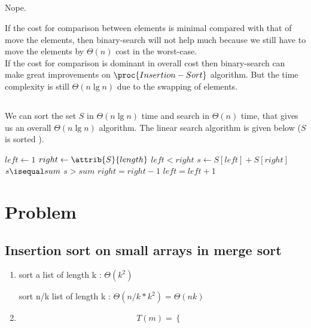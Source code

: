 \documentclass[paper=a4, fontsize=11pt,oneside]{book} %
\numberwithin{equation}{section} %
\numberwithin{figure}{section} %
\numberwithin{table}{section} %
\begin{document}
		\subsection{}
			Nope. 
			
			If the cost for comparison between elements is minimal compared with that of move the elements, then binary-search will not help much because we still have to move the elements by $\Theta(n)$ cost in the worst-case. \\
			If the cost for comparison is dominant in overall cost then binary-search can make great improvements on $\proc{Insertion-Sort}$ algorithm. But the time complexity is still $\Theta(n \lg n)$ due to the swapping of elements.
			
	   \subsection{}
		   We can sort the set $S$ in $\Theta(n \lg n)$ time and search in $\Theta(n)$ time, that gives us an overall $\Theta(n \lg n)$ algorithm.
		   The linear search algorithm is given below ($S$ is sorted ).
		   \begin{codebox}
			   \li $left \gets 1$
			   \li $right \gets \attrib{S}{length}$
			   \li \While $left < right$
			   \li \Do
				   $s \gets S[left] + S[right]$
			   \li \If $s \isequal sum$
			   \li \Then 
				   \Return {}
			   \li \ElseIf $s > sum$
			   \li \Then
				   $right = right - 1$
			   \li \Else
			   \li	$left = left + 1$
			   \End
			   \End
			   \li \Return {}
			   
			   \End
		   \end{codebox}

\section{Problem}
	\subsection{Insertion sort on small arrays in merge sort}
		\begin{enumerate}[a]
			\item sort a list of length k : $\Theta(k^2)$ 

				  sort n/k list of length k : $\Theta(n/k * k^2) = \Theta(nk)$

			\item \[
						T(m) = 
						\begin{cases}
						
						\end{cases}

					\]
		\end{enumerate}
			
\end{document}
